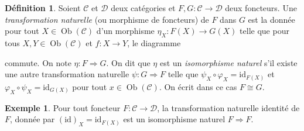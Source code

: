 \documentclass{article}
\newcommand{\id}{\mathrm{id}}
\newcommand{\cat}{\mathcal{C}}
\newcommand{\catt}{\mathcal{D}}
\DeclareMathOperator{\Ob}{Ob}
\theoremstyle{plain}
\theoremstyle{definition}
\newtheorem{definition}[theorem]{Définition}
\newtheorem{example}[theorem]{Exemple}
\theoremstyle{remark}
\begin{document}
\begin{definition}
    Soient $\cat$ et $\catt$ deux catégories et $F,G : \cat \to \catt$ deux foncteurs. Une \emph{transformation naturelle} (ou morphisme de foncteurs) de $F$ dans $G$ est la donnée pour tout $X \in \Ob(\cat)$ d'un morphisme $\eta_X : F(X) \to G(X)$ telle que pour tous $X, Y\in \Ob(\cat)$ et $f : X \to Y$, le diagramme
    \begin{center}
    \end{center}
    commute. On note $\eta : F \Rightarrow G$. On dit que $\eta$ est un \emph{isomorphisme naturel} s'il existe une autre transformation naturelle $\psi : G\Rightarrow F$ telle que $\psi_X \circ \varphi_X = \id_{F(X)}$ et $\varphi_X \circ \psi_X = \id_{G(X)}$ pour tout $x \in \Ob(\cat)$. On écrit dans ce cas $F \cong G$.
\end{definition}

\begin{example}
    Pour tout foncteur $F : \cat \to \catt$, la transformation naturelle identité de $F$, donnée par $(\id)_X = \id_{F(X)}$ est un isomorphisme naturel $F \Rightarrow F$.
\end{example}
\end{document}
